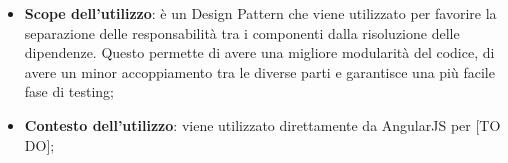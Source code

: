 		\begin{itemize}
			\item \textbf{Scope dell'utilizzo}: è un Design Pattern che viene utilizzato per favorire la separazione delle responsabilità tra i componenti dalla risoluzione delle dipendenze. Questo permette di avere una migliore modularità del codice, di avere un minor accoppiamento tra le diverse parti e garantisce una più facile fase di testing;
			\item \textbf{Contesto dell'utilizzo}: viene utilizzato direttamente da AngularJS per [TO DO];
		\end{itemize}

